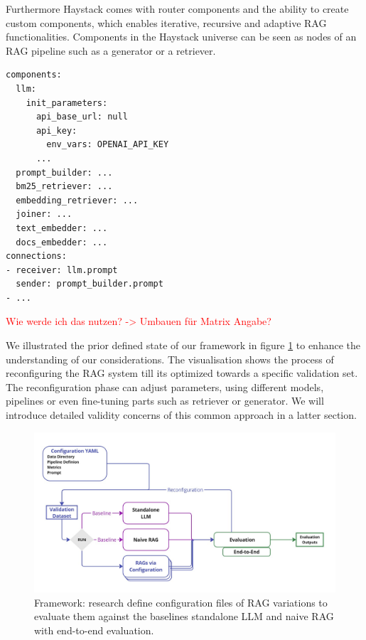 Furthermore Haystack comes with router components and the ability to create custom components, which enables iterative, recursive and adaptive RAG functionalities. Components in the Haystack universe can be seen as nodes of an RAG pipeline such as a generator or a retriever. 

\newpage
\begin{verbatim}
components:
  llm:
    init_parameters:
      api_base_url: null
      api_key:
        env_vars: OPENAI_API_KEY
      ...
  prompt_builder: ...
  bm25_retriever: ...
  embedding_retriever: ...
  joiner: ...
  text_embedder: ...
  docs_embedder: ...
connections:
- receiver: llm.prompt
  sender: prompt_builder.prompt
- ...
\end{verbatim}

\textcolor{red}{Wie werde ich das nutzen? -> Umbauen für Matrix Angabe?}

We illustrated the prior defined state of our framework in figure \ref{fig:framework-baselines} to enhance the understanding of our considerations. The visualisation shows the process of reconfiguring the RAG system till its optimized towards a specific validation set. The reconfiguration phase can adjust parameters, using different models, pipelines or even fine-tuning parts such as retriever or generator. We will introduce detailed validity concerns of this common approach in a latter section.

\begin{figure}
  \centering
  \includegraphics[width=\textwidth]{images/FrameworkBaselines.pdf}
  \caption{Framework: research define configuration files of RAG variations to evaluate them against the baselines standalone LLM and naive RAG with end-to-end evaluation.}
  \label{fig:framework-baselines}
\end{figure}

